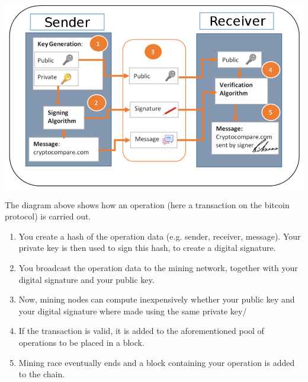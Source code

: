 \begin{center}
   \includegraphics[scale = 0.35]{diagrams/transaction_diagram.png}
\end{center}

The diagram above shows how an operation (here a transaction on the bitcoin protocol) is carried out.

\begin{enumerate}
  
  \item You create a hash of the operation data (e.g. sender, receiver, message).
    Your private key is then used to sign this hash, to create a digital signature.

  \item You broadcast the operation data to the mining network, together with your digital signature and your public key.

  \item Now, mining nodes can compute inexpensively whether your public key and your digital
    signature where made using the same private key/
    
  \item If the transaction is valid, it is added to the aforementioned pool of operations to be placed in a block.

  \item Mining race eventually ends and a block containing your operation is added to the chain.
    
\end{enumerate}
